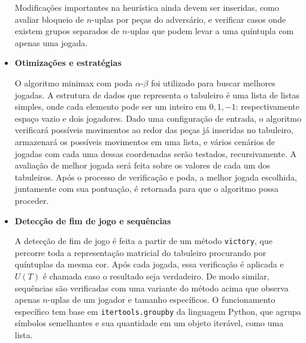 \documentclass{article}
\begin{document}
\begin{itemize}
        Modificações importantes na heurística ainda devem ser inseridas,
        como avaliar bloqueio de $n$-uplas por peças do adversário,
        e verificar casos onde existem grupos separados de $n$-uplas que
        podem levar a uma quíntupla com apenas uma jogada.

    \item \textbf{Otimizações e estratégias}

        O algoritmo minimax com poda $\alpha$-$\beta$ foi utilizado para
        buscar melhores jogadas. A estrutura de dados que representa o
        tabuleiro é uma lista de listas simples, onde cada elemento pode
        ser um inteiro em $0, 1, -1$: respectivamente espaço vazio e dois
        jogadores. Dado uma configuração de entrada, o algoritmo verificará
        possíveis movimentos ao redor das peças já inseridas no tabuleiro,
        armazenará os possíveis movimentos em uma lista, e vários cenários
        de jogadas com cada uma dessas coordenadas serão testados,
        recursivamente. A avaliação de melhor jogada será feita sobre os
        valores de cada um dos tabuleiros. Após o processo de verificação
        e poda, a melhor jogada escolhida, juntamente com sua pontuação,
        é retornada para que o algoritmo possa proceder.

    \item \textbf{Detecção de fim de jogo e sequências}

        A detecção de fim de jogo é feita a partir de um método
        \texttt{victory}, que percorre toda a representação matricial do
        tabuleiro procurando por quíntuplas da mesma cor. Após cada jogada,
        essa verificação é aplicada e $U(T)$ é chamada caso o resultado
        seja verdadeiro. De modo similar, sequências são verificadas com
        uma variante do método acima que observa apenas $n$-uplas de um
        jogador e tamanho específicos. O funcionamento específico tem
        base em \texttt{itertools.groupby} da linguagem Python, que
        agrupa símbolos semelhantes e sua quantidade em um objeto iterável,
        como uma lista.

\end{itemize}
\end{document}
